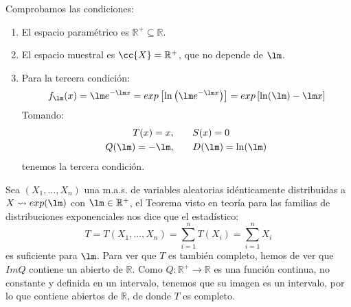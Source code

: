 \begin{ejercicio}
\begin{enumerate}[label=\alph*)]
            Comprobamos las condiciones:
            \begin{enumerate}[label=\arabic*.]
                \item El espacio paramétrico es $\mathbb{R}^+ \subseteq \mathbb{R}$.
                \item El espacio muestral es $\cc{X} = \mathbb{R}^+$, que no depende de $\lm$.
                \item Para la tercera condición:
                    \begin{equation*}
                        f_\lm(x) = \lm e^{-\lm x} = exp\left[\ln\left(\lm e^{-\lm x} \right)\right] = exp\left[\ln(\lm) -\lm x\right]
                    \end{equation*}
                    Tomando:
                    \begin{align*}
                        T(x) = x, &\qquad S(x) = 0 \\
                        Q(\lm) = -\lm, &\qquad D(\lm) = \ln(\lm)
                    \end{align*}
                    tenemos la tercera condición.
            \end{enumerate}
            Sea $(X_1, \ldots, X_n)$ una m.a.s. de variables aleatorias idénticamente distribuidas a $X\rightsquigarrow exp(\lm)$ con $\lm \in \mathbb{R}^+$, el Teorema visto en teoría para las familias de distribuciones exponenciales nos dice que el estadístico:
            \begin{equation*}
                T = T(X_1, \ldots, X_n) = \sum_{i=1}^{n}T(X_i) = \sum_{i=1}^{n}X_i
            \end{equation*}
            es suficiente para $\lm$. Para ver que $T$ es también completo, hemos de ver que $Im Q$ contiene un abierto de $\mathbb{R}$. Como $Q:\mathbb{R}^+\to\mathbb{R}$ es una función continua, no constante y definida en un intervalo, tenemos que su imagen es un intervalo, por lo que contiene abiertos de $\mathbb{R}$, de donde $T$ es completo.
    \end{enumerate}
\end{ejercicio}

